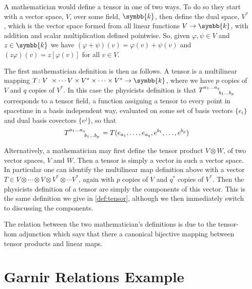 \documentclass[fleqn]{NotesClass}
\renewcommand{\field}{\symbb{k}}
\renewcommand{\ve}[1]{e_{#1}}
\newcommand{\dualve}[1]{e^{#1}}
\begin{document}
\begin{appendices}
        A mathematician would define a tensor in one of two ways.
        To do so they start with a vector space, \(V\), over some field, \(\field\), then define the dual space, \(V^*\), which is the vector space formed from all linear functions \(V \to \field\), with addition and scalar multiplication defined pointwise.
        So, given \(\varphi, \psi \in V\) and \(z \in \field\) we have \((\varphi + \psi)(v) = \varphi(v) + \psi(v)\) and \((z\varphi)(v) = z[\varphi(v)]\) for all \(v \in V\).
        
        The first mathematician definition is then as follows.
        A tensor is a multilinear mapping \(T \colon V\ \times \dotsm V \times V^* \times \dotsb \times V^* \to \field\), where we have \(p\) copies of \(V\) and \(q\) copies of \(V^*\).
        In this case the physicists definition is that \(\tensor{T}{^{a_1 \dotso a_q}_{b_1 \dotso b_p}}\) corresponds to a tensor field, a function assigning a tensor to every point in spacetime in a basis independent way, evaluated on some set of basis vectors \(\{\ve{i}\}\) and dual basis covectors \(\{\dualve{j}\}\), so that
        \begin{equation}
            \tensor{T}{^{a_1 \dotso a_q}_{b_1 \dotso b_p}} = T(\ve{a_1}, \dotsc, \ve{a_q}, \dualve{b_1}, \dotsc, \dualve{b_p})
        \end{equation}
        
        Alternatively, a mathematician may first define the tensor product \(V \otimes W\), of two vector spaces, \(V\) and \(W\).
        Then a tensor is simply a vector in such a vector space.
        In particular one can identify the multilinear map definition above with a vector \(T \in V \otimes \dotsb \otimes V \otimes V^* \otimes \dotsm V^*\), again with \(p\) copies of \(V\) and \(q^*\) copies of \(V^*\).
        Then the physicists definition of a tensor are simply the components of this vector.
        This is the same definition we give in \cref{def:tensor}, although we then immediately switch to discussing the components.
        
        The relation between the two mathematician's definitions is due to the tensor-hom adjunction which says that there a canonical bijective mapping between tensor products and linear maps.
        
        \chapter{Garnir Relations Example}\label{app:garnir example}

\end{appendices}
\end{document}
